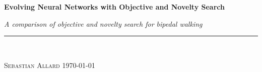 
\vspace*{5cm}

\begin{flushleft}
\Huge \textsf{\textbf{Evolving Neural Networks with Objective and Novelty Search}}
\end{flushleft}

\emph{\large A comparison of objective and novelty search for bipedal walking} \hfill \\
\rule{\textwidth}{1pt} \\

\begin{flushright}
\textsc{Sebastian Allard} \quad \today
\end{flushright}


\thispagestyle{empty}
